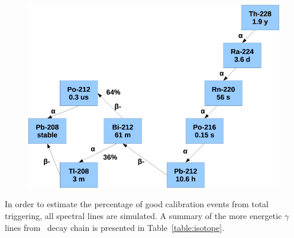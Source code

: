 \begin{figure}
	\begin{center}
	\includegraphics[height= 0.5\textheight]{figs/Th228Check.PNG}%
		\label{fig:th228}		
		\end{center}
	
	\end{figure} 
 
In order to estimate the percentage of good calibration events from total triggering, all spectral lines are simulated.  
A summary of the more energetic $\gamma$ lines from \Th\ decay chain is presented in Table~\ref{table:isotope}.
\begin{table}
\begin{center}
\caption{High energy $\gamma$lines from \Th\ decay chain}
\label{table:isotope}
\end{center}
\end{table}

